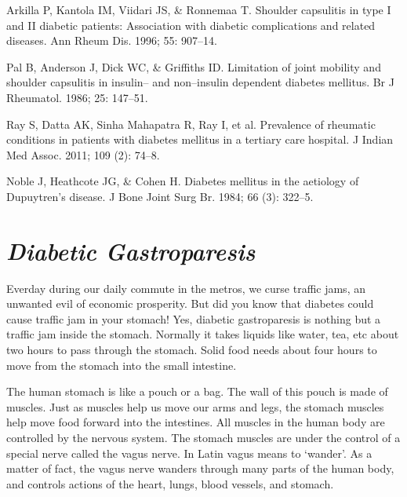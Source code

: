 \begin{thebibliography}{99}
 Arkilla P, Kantola IM, Viidari JS, \& Ronnemaa T. Shoulder capsulitis in type I and II diabetic patients: Association with diabetic complications and related diseases. Ann Rheum Dis. 1996; 55: 907–14.

  Pal B, Anderson J, Dick WC, \& Griffiths ID. Limitation of joint mobility and shoulder capsulitis in insulin– and non–insulin dependent diabetes mellitus. Br J Rheumatol. 1986; 25: 147–51.

  Ray S, Datta AK, Sinha Mahapatra R, Ray I, et al. Prevalence of rheumatic conditions in patients with diabetes mellitus in a tertiary care hospital. J Indian Med Assoc. 2011; 109 (2): 74–8.

  Noble J, Heathcote JG, \& Cohen H. Diabetes mellitus in the aetiology of Dupuytren’s disease. J Bone Joint Surg Br. 1984; 66 (3): 322–5.

 \end{thebibliography}


\chapter{\textit{Diabetic Gastroparesis}}

Everday during our daily commute in the metros, we curse traffic jams, an unwanted evil of economic prosperity. But did you know that diabetes could cause traffic jam in your stomach! Yes, diabetic gastroparesis is nothing but a traffic jam inside the stomach. Normally it takes liquids like water, tea, etc about two hours to pass through the stomach. Solid food needs about four hours to move from the stomach into the small intestine.

The human stomach is like a pouch or a bag. The wall of this pouch is made of muscles. Just as muscles help us move our arms and legs, the stomach muscles help move food forward into the intestines. All muscles in the human body are controlled by the nervous system. The stomach muscles are under the control of a special nerve called the vagus nerve. In Latin vagus means to ‘wander’. As a matter of fact, the vagus nerve wanders through many parts of the human body, and controls actions of the heart, lungs, blood vessels, and stomach.


